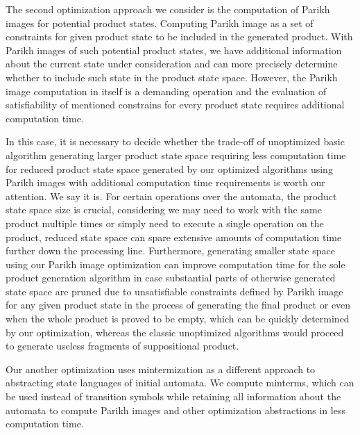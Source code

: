 
The second optimization approach we consider is the computation of Parikh images for potential product states. Computing Parikh image as a set of constraints for given product state to be included in the generated product. With Parikh images of such potential product states, we have additional information about the current state under consideration and can more precisely determine whether to include such state in the product state space. However, the Parikh image computation in itself is a demanding operation and the evaluation of satisfiability of mentioned constrains for every product state requires additional computation time.

In this case, it is necessary to decide whether the trade-off of unoptimized basic algorithm generating larger product state space requiring less computation time for reduced product state space generated by our optimized algorithms using Parikh images with additional computation time requirements is worth our attention. We say it is. For certain operations over the automata, the product state space size is crucial, considering we may need to work with the same product multiple times or simply need to execute a single operation on the product, reduced state space can spare extensive amounts of computation time further down the processing line. Furthermore, generating smaller state space using our Parikh image optimization can improve computation time for the sole product generation algorithm in case substantial parts of otherwise generated state space are pruned due to unsatisfiable constraints defined by Parikh image for any given product state in the process of generating the final product or even when the whole product is proved to be empty, which can be quickly determined by our optimization, whereas the classic unoptimized algorithms would proceed to generate useless fragments of suppositional product.


Our another optimization uses mintermization as a different approach to abstracting state languages of initial automata. We compute minterms, which can be used instead of transition symbols while retaining all information about the automata to compute Parikh images and other optimization abstractions in less computation time.


